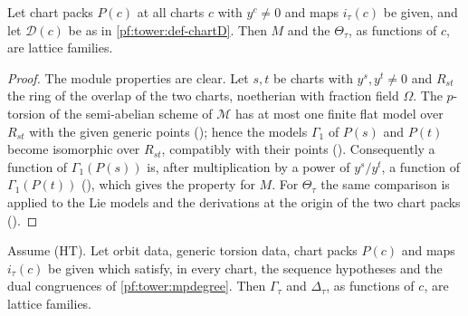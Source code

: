 \begin{lemma}\label{pf:tower:hptotal}
Let chart packs $P(c)$ at all charts $c$ with $y^c\ne0$ and maps $i_\tau(c)$ be given, and let $\mathcal D(c)$ be as in
\cref{pf:tower:def-chartD}. Then $M$ and the $\Theta_\tau$, as functions of $c$, are lattice families.
\end{lemma}

\begin{proof}
The module properties are clear. Let $s,t$ be charts with $y^s,y^t\ne0$ and $R_{st}$ the ring of the overlap of the two charts,
noetherian with fraction field $\Omega$. The $p$-torsion of the semi-abelian scheme of $\mathcal M$ has at most one finite flat
model over $R_{st}$ with the given generic points (); hence the models
$\Gamma_1$ of $P(s)$ and $P(t)$ become isomorphic over $R_{st}$, compatibly with their points
(). Consequently a function of $\Gamma_1(P(s))$ is, after
multiplication by a power of $y^s/y^t$, a function of $\Gamma_1(P(t))$
(), which gives the property for $M$. For $\Theta_\tau$
the same comparison is applied to the Lie models and the derivations at the origin of the two chart packs
().
\end{proof}

\begin{lemma}\label{pf:tower:mpheight}
Assume \textup{(HT)}. Let orbit data, generic torsion data, chart packs $P(c)$ and maps $i_\tau(c)$ be given which satisfy, in
every chart, the sequence hypotheses and the dual congruences of \cref{pf:tower:mpdegree}. Then $\Gamma_\tau$ and $\Delta_\tau$,
as functions of $c$, are lattice families.
\end{lemma}

